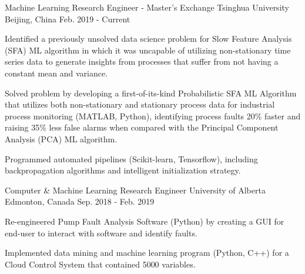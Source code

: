 

\begin{cventries}

  \cventry
    {Machine Learning Research Engineer - Master's Exchange} %
    {Tsinghua University} %
    {Beijing, China} %
    {Feb. 2019 - Current} %
    {
      \begin{cvitems} %
        \item{Identified a previously unsolved data science problem for Slow Feature Analysis (SFA) ML algorithm in which it was uncapable of utilizing non-stationary time series data to generate insights from processes that suffer from not having a constant mean and variance.}
        \item {Solved problem by developing a first-of-its-kind Probabilistic SFA ML Algorithm that utilizes both non-stationary and stationary process data for industrial process monitoring (MATLAB, Python), identifying process faults 20\% faster and raising 35\% less false alarms when compared with the Principal Component Analysis (PCA) ML algorithm.}
        \item {Programmed automated pipelines (Scikit-learn, Tensorflow), including backpropagation algorithms and intelligent initialization strategy.}
      \end{cvitems}
    }

  \cventry
    {Computer \& Machine Learning Research Engineer} %
    {University of Alberta} %
    {Edmonton, Canada} %
    {Sep. 2018 - Feb. 2019} %
    {
      \begin{cvitems} %
        \item {Re-engineered Pump Fault Analysis Software (Python) by creating a GUI for end-user to  interact with software and identify faults.}
        \item {Implemented data mining and machine learning program (Python, C++) for a Cloud Control System that contained 5000 variables.}        
      \end{cvitems}
    }


\end{cventries}
